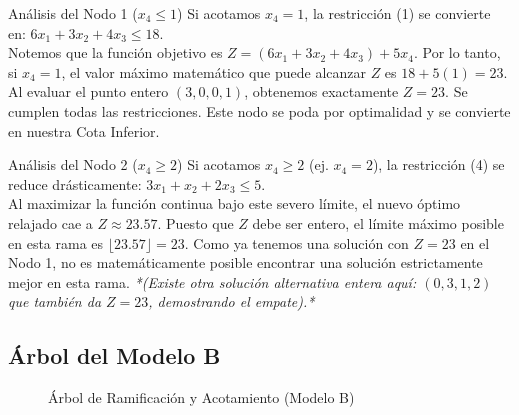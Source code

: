 \documentclass[10pt,a4paper]{article}
\begin{document}
\begin{nota}{Análisis del Nodo 1 ($x_4 \leq 1$)}
Si acotamos $x_4 = 1$, la restricción (1) se convierte en:
$6x_1 + 3x_2 + 4x_3 \leq 18$. \\
Notemos que la función objetivo es $Z = (6x_1 + 3x_2 + 4x_3) + 5x_4$.
Por lo tanto, si $x_4 = 1$, el valor máximo matemático que puede alcanzar $Z$ es $18 + 5(1) = 23$. 
Al evaluar el punto entero $(3, 0, 0, 1)$, obtenemos exactamente $Z = 23$. Se cumplen todas las restricciones. Este nodo se poda por optimalidad y se convierte en nuestra Cota Inferior.
\end{nota}

\begin{alerta}{Análisis del Nodo 2 ($x_4 \geq 2$)}
Si acotamos $x_4 \geq 2$ (ej. $x_4=2$), la restricción (4) se reduce drásticamente: 
$3x_1 + x_2 + 2x_3 \leq 5$. \\
Al maximizar la función continua bajo este severo límite, el nuevo óptimo relajado cae a $Z \approx 23.57$. 
Puesto que $Z$ debe ser entero, el límite máximo posible en esta rama es $\lfloor 23.57 \rfloor = 23$. Como ya tenemos una solución con $Z = 23$ en el Nodo 1, no es matemáticamente posible encontrar una solución estrictamente mejor en esta rama. 
\textit{*(Existe otra solución alternativa entera aquí: $(0,3,1,2)$ que también da $Z=23$, demostrando el empate).* }
\end{alerta}

\subsection{Árbol del Modelo B}

\begin{figure}[H]
    \centering
    \caption{Árbol de Ramificación y Acotamiento (Modelo B)}
\end{figure}
\end{document}

